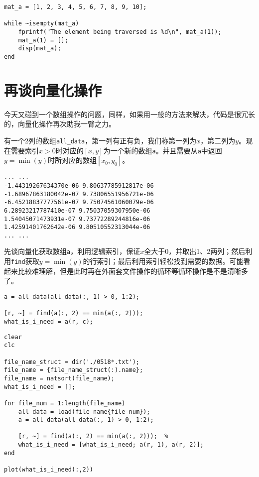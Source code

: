 \begin{verbatim}
mat_a = [1, 2, 3, 4, 5, 6, 7, 8, 9, 10];

while ~isempty(mat_a)
    fprintf("The element being traversed is %d\n", mat_a(1));
    mat_a(1) = [];
    disp(mat_a);
end
\end{verbatim}

\section{再谈向量化操作}

今天又碰到一个数组操作的问题，同样，如果用一般的方法来解决，代码是很冗长的，向量化操作再次助我一臂之力。

有一个2列的数组\texttt{all_data}，第一列有正有负，我们称第一列为$ x $，第二列为$ y $。现在需要索引$ x>0 $时对应的$ [x, y] $为一个新的数组\texttt{a}。并且需要从\texttt{a}中返回$ y=\min(y) $时所对应的数组$ [x_0, y_0] $。

\begin{verbatim}
... ...
-1.44319267634370e-06 9.80637785912817e-06
-1.68967863180042e-07 9.73806551956721e-06
-6.45218837777561e-07 9.75074561060079e-06
6.28923217787410e-07 9.75037059307950e-06
1.54045071473931e-07 9.73772289244816e-06
1.42591401762642e-06 9.80510552313044e-06
... ...
\end{verbatim}

先谈向量化获取数组\texttt{a}，利用逻辑索引，保证$ x $全大于0，并取出1、2两列；然后利用\texttt{find}获取$ y=\min(y) $的行索引；最后利用索引轻松找到需要的数据。可能看起来比较难理解，但是此时再在外面套文件操作的循环等循环操作是不是清晰多了。

\begin{verbatim}
a = all_data(all_data(:, 1) > 0, 1:2);

[r, ~] = find(a(:, 2) == min(a(:, 2)));
what_is_i_need = a(r, c);
\end{verbatim}

\begin{verbatim}
clear
clc

file_name_struct = dir('./0518*.txt');
file_name = {file_name_struct(:).name};
file_name = natsort(file_name);
what_is_i_need = [];

for file_num = 1:length(file_name)
    all_data = load(file_name{file_num});
    a = all_data(all_data(:, 1) > 0, 1:2);
    
    [r, ~] = find(a(:, 2) == min(a(:, 2)));  % 
    what_is_i_need = [what_is_i_need; a(r, 1), a(r, 2)];
end

plot(what_is_i_need(:,2))
\end{verbatim}

